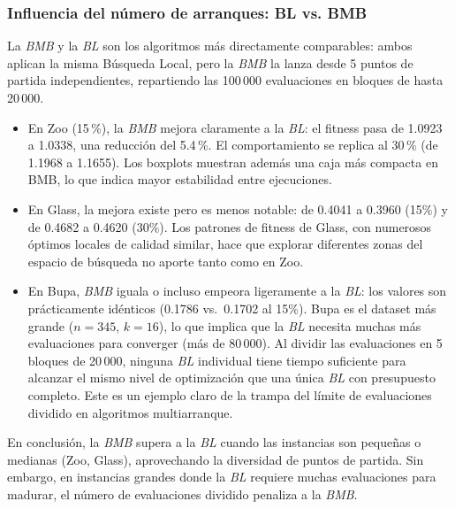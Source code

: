 \documentclass[12pt]{article}
\begin{document}
\subsubsection*{Influencia del número de arranques: BL vs. BMB}
 
La \textit{BMB} y la \textit{BL} son los algoritmos más directamente comparables: ambos aplican la misma
Búsqueda Local, pero la \textit{BMB} la lanza desde 5 puntos de partida independientes,
repartiendo las 100\,000 evaluaciones en bloques de hasta 20\,000.
 
\begin{itemize}
    \item En {Zoo} (15\,\%), la \textit{BMB} mejora claramente a la \textit{BL}: el fitness pasa de
    1.0923 a 1.0338, una reducción del 5.4\,\%.  El comportamiento se replica al 30\,\%
    (de 1.1968 a 1.1655).  Los boxplots muestran además una caja más compacta en BMB,
    lo que indica mayor estabilidad entre ejecuciones.
 
    \item En {Glass}, la mejora existe pero es menos notable: de 0.4041 a 0.3960
    (15\%) y de 0.4682 a 0.4620 (30\%).  Los patrones de fitness de Glass, con
    numerosos óptimos locales de calidad similar, hace que explorar diferentes zonas del
    espacio de búsqueda no aporte tanto como en Zoo.
 
    \item En {Bupa}, \textit{BMB} iguala o incluso empeora ligeramente a la \textit{BL}: los
    valores son prácticamente idénticos (0.1786 vs.\ 0.1702 al 15\%).  Bupa es el
    dataset más grande ($n=345$, $k=16$), lo que implica que la \textit{BL} necesita muchas más
    evaluaciones para converger (más de 80\,000).  Al dividir las evaluaciones en 5
    bloques de 20\,000, ninguna \textit{BL} individual tiene tiempo suficiente para alcanzar el
    mismo nivel de optimización que una única \textit{BL} con presupuesto completo. Este es un
    ejemplo claro de la trampa del límite de evaluaciones dividido en algoritmos
    multiarranque.
\end{itemize}
 
\noindent En conclusión, la \textit{BMB} supera a la \textit{BL} cuando las instancias son pequeñas o
medianas (Zoo, Glass), aprovechando la diversidad de puntos de partida.  Sin embargo,
en instancias grandes donde la \textit{BL} requiere muchas evaluaciones para madurar, el
número de evaluaciones dividido penaliza a la \textit{BMB}.
 
\end{document}
